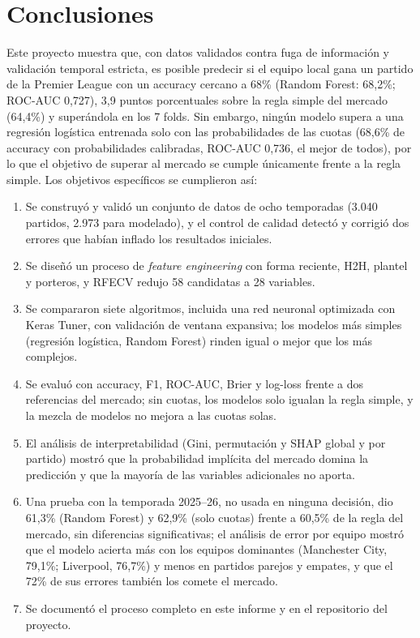\documentclass{ieeeaccess}
\begin{document}
\section{Conclusiones}
\label{sec:conclusiones}
Este proyecto muestra que, con datos validados contra fuga de información y validación temporal estricta, es posible predecir si el equipo local gana un partido de la Premier League con un accuracy cercano a 68\% (Random Forest: 68,2\%; ROC-AUC 0,727), 3,9 puntos porcentuales sobre la regla simple del mercado (64,4\%) y superándola en los 7 folds. Sin embargo, ningún modelo supera a una regresión logística entrenada solo con las probabilidades de las cuotas (68,6\% de accuracy con probabilidades calibradas, ROC-AUC 0,736, el mejor de todos), por lo que el objetivo de superar al mercado se cumple únicamente frente a la regla simple. Los objetivos específicos se cumplieron así:
\begin{enumerate}
\item Se construyó y validó un conjunto de datos de ocho temporadas (3.040 partidos, 2.973 para modelado), y el control de calidad detectó y corrigió dos errores que habían inflado los resultados iniciales.
\item Se diseñó un proceso de \textit{feature engineering} con forma reciente, H2H, plantel y porteros, y RFECV redujo 58 candidatas a 28 variables.
\item Se compararon siete algoritmos, incluida una red neuronal optimizada con Keras Tuner, con validación de ventana expansiva; los modelos más simples (regresión logística, Random Forest) rinden igual o mejor que los más complejos.
\item Se evaluó con accuracy, F1, ROC-AUC, Brier y log-loss frente a dos referencias del mercado; sin cuotas, los modelos solo igualan la regla simple, y la mezcla de modelos no mejora a las cuotas solas.
\item El análisis de interpretabilidad (Gini, permutación y SHAP global y por partido) mostró que la probabilidad implícita del mercado domina la predicción y que la mayoría de las variables adicionales no aporta.
\item Una prueba con la temporada 2025--26, no usada en ninguna decisión, dio 61,3\% (Random Forest) y 62,9\% (solo cuotas) frente a 60,5\% de la regla del mercado, sin diferencias significativas; el análisis de error por equipo mostró que el modelo acierta más con los equipos dominantes (Manchester City, 79,1\%; Liverpool, 76,7\%) y menos en partidos parejos y empates, y que el 72\% de sus errores también los comete el mercado.
\item Se documentó el proceso completo en este informe y en el repositorio del proyecto.
\end{enumerate}
\end{document}
